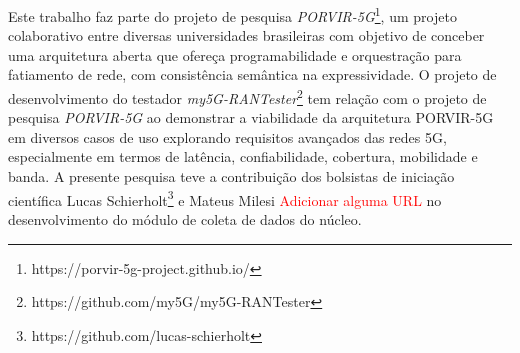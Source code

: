 Este trabalho faz parte do projeto de pesquisa \textit{PORVIR-5G}\footnote{https://porvir-5g-project.github.io/}, um projeto colaborativo entre diversas universidades brasileiras com objetivo de conceber uma arquitetura aberta que ofereça programabilidade e orquestração para fatiamento de rede, com consistência semântica na expressividade.
O projeto de desenvolvimento do testador \textit{my5G-RANTester}\footnote{https://github.com/my5G/my5G-RANTester} tem relação com o projeto de pesquisa \textit{PORVIR-5G} ao demonstrar a viabilidade da arquitetura PORVIR-5G em diversos casos de uso explorando requisitos avançados das redes 5G, especialmente em termos de latência, confiabilidade, cobertura, mobilidade e banda.
A presente pesquisa teve a contribuição dos bolsistas de iniciação científica Lucas Schierholt\footnote{https://github.com/lucas-schierholt} e Mateus Milesi \textcolor{red}{Adicionar alguma URL} no desenvolvimento do módulo de coleta de dados do núcleo.
